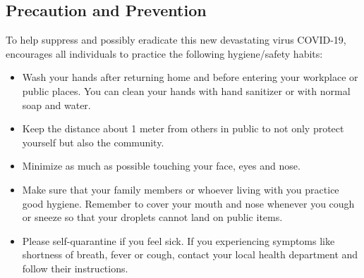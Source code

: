     \subsection{Precaution and Prevention}
      \par To help suppress and possibly eradicate this new devastating virus COVID-19, \textcite{Q&A_WHO} encourages all individuals to practice the following hygiene/safety habits:
      \begin{itemize}
        \item Wash your hands after returning home and before entering your workplace or public places. You can clean your hands with hand sanitizer or with normal soap and water.
        \item Keep the distance about 1 meter from others in public to not only protect yourself but also the community.
        \item Minimize as much as possible touching your face, eyes and nose.
        \item Make sure that your family members or whoever living with you practice good hygiene. Remember to cover your mouth and nose whenever you cough or sneeze so that your droplets cannot land on public items.
        \item Please self-quarantine if you feel sick. If you experiencing symptoms like shortness of breath, fever or cough, contact your local health department and follow their instructions.
      \end{itemize}

